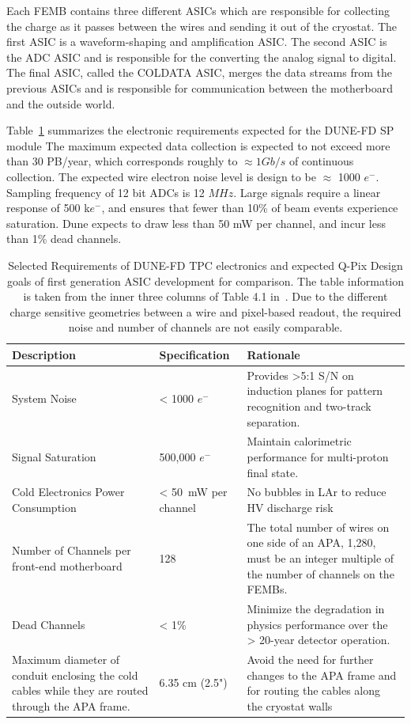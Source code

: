 Each FEMB contains three different ASICs which are responsible for collecting the charge as it passes between the wires and sending it out of the cryostat.
The first ASIC is a waveform-shaping and amplification ASIC.
The second ASIC is the ADC ASIC and is responsible for the converting the analog signal to digital.
The final ASIC, called the COLDATA ASIC, merges the data streams from the previous ASICs and is responsible for communication between the motherboard and the outside world.

Table~\ref{tab:dune_tpc_elec} summarizes the electronic requirements expected for the DUNE-FD SP module
The maximum expected data collection is expected to not exceed more than 30 PB/year, which corresponds roughly to $\approx 1 Gb/s$ of continuous collection.
The expected wire electron noise level is design to be $\approx$ 1000 $e^{-}$.
Sampling frequency of 12 bit ADCs is 12 $\unit{MHz}$.
Large signals require a linear response of 500 k$e^{-}$, and ensures that fewer than 10\% of beam events experience saturation.
Dune expects to draw less than 50 mW per channel, and incur less than 1\% dead channels.

\begin{table}
\begin{center}
\begin{tabular}{|| p{50mm} | p{40mm} | p{60mm} ||}
 \hline
 Description & Specification & Rationale \\ [0.5ex]
 \hline\hline
  System Noise & < 1000 $e^{-}$ & Provides >5:1 S/N on induction planes for pattern recognition and two-track separation. \\
 \hline
  Signal Saturation & 500,000 $e^{-}$ & Maintain calorimetric performance for multi-proton final state. \\
 \hline
  Cold Electronics Power Consumption & < 50~\unit{mW} per channel & No bubbles in LAr to reduce HV discharge risk\\
 \hline
  Number of Channels per front-end motherboard & 128 & The total number of wires on one side of an APA, 1,280, must be an integer multiple of the number of channels on the FEMBs. \\
 \hline
  Dead Channels & < 1\% & Minimize the degradation in physics performance over the > 20-year detector operation. \\
 \hline
  Maximum diameter of conduit enclosing the cold cables while they are routed through the APA frame. & 6.35 cm (2.5") & Avoid the need for further changes to the APA frame and for routing the cables along the cryostat walls \\
 \hline
\end{tabular}
\caption{Selected Requirements of DUNE-FD TPC electronics and expected Q-Pix Design goals of first generation ASIC development for comparison.
The table information is taken from the inner three columns of Table 4.1 in~\citep{DUNE-FD_TDRv4:Abi_2020}.
Due to the different charge sensitive geometries between a wire and pixel-based readout, the required noise and number of channels are not easily comparable.
}
\label{tab:dune_tpc_elec}
\end{center}
\end{table}

